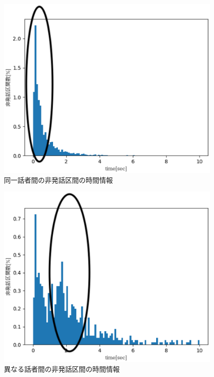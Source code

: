 \begin{figure}[H]
  \begin{center}
    \includegraphics{./figure/pre_same1.eps}
  \end{center}
  \caption{同一話者間の非発話区間の時間情報 \label{fig:same_sp}}
\end{figure}

\begin{figure}[H]
  \begin{center}
    \includegraphics{./figure/pre_other2.eps}
  \end{center}
  \caption{異なる話者間の非発話区間の時間情報 \label{fig:different_sp}}
\end{figure}

